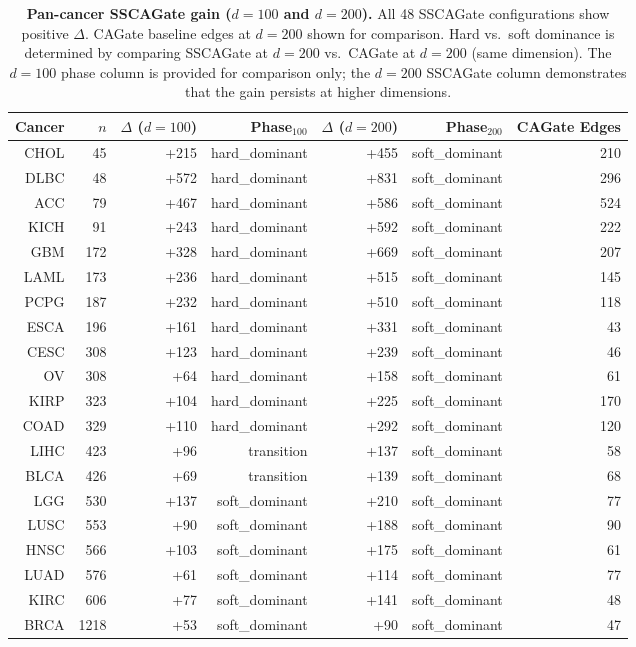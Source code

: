 \documentclass[12pt,a4paper]{article}
\begin{document}
\begin{table}[htbp]
\centering
\caption{\textbf{Pan-cancer SSCAGate gain ($d = 100$ and $d = 200$).}
All 48 SSCAGate configurations show positive $\Delta$. CAGate baseline edges
at $d = 200$ shown for comparison. Hard vs.\ soft dominance is determined by
comparing SSCAGate at $d = 200$ vs.\ CAGate at $d = 200$ (same dimension). The $d = 100$ phase column is provided for comparison only; the $d = 200$ SSCAGate
column demonstrates that the gain persists at higher dimensions.}
\label{tab:s1_pancan}
\small
\begin{tabular}{rrrrrrr}
\toprule
Cancer & $n$ & $\Delta$ ($d=100$) & Phase$_{100}$ & $\Delta$ ($d=200$) & Phase$_{200}$ & CAGate Edges \\
\midrule
CHOL & 45 & +215 & hard\_dominant & +455 & soft\_dominant & 210 \\
DLBC & 48 & +572 & hard\_dominant & +831 & soft\_dominant & 296 \\
ACC & 79 & +467 & hard\_dominant & +586 & soft\_dominant & 524 \\
KICH & 91 & +243 & hard\_dominant & +592 & soft\_dominant & 222 \\
GBM & 172 & +328 & hard\_dominant & +669 & soft\_dominant & 207 \\
LAML & 173 & +236 & hard\_dominant & +515 & soft\_dominant & 145 \\
PCPG & 187 & +232 & hard\_dominant & +510 & soft\_dominant & 118 \\
ESCA & 196 & +161 & hard\_dominant & +331 & soft\_dominant & 43 \\
CESC & 308 & +123 & hard\_dominant & +239 & soft\_dominant & 46 \\
OV & 308 & +64 & hard\_dominant & +158 & soft\_dominant & 61 \\
KIRP & 323 & +104 & hard\_dominant & +225 & soft\_dominant & 170 \\
COAD & 329 & +110 & hard\_dominant & +292 & soft\_dominant & 120 \\
LIHC & 423 & +96 & transition & +137 & soft\_dominant & 58 \\
BLCA & 426 & +69 & transition & +139 & soft\_dominant & 68 \\
LGG & 530 & +137 & soft\_dominant & +210 & soft\_dominant & 77 \\
LUSC & 553 & +90 & soft\_dominant & +188 & soft\_dominant & 90 \\
HNSC & 566 & +103 & soft\_dominant & +175 & soft\_dominant & 61 \\
LUAD & 576 & +61 & soft\_dominant & +114 & soft\_dominant & 77 \\
KIRC & 606 & +77 & soft\_dominant & +141 & soft\_dominant & 48 \\
BRCA & 1218 & +53 & soft\_dominant & +90 & soft\_dominant & 47 \\\bottomrule
\end{tabular}
\end{table}
\end{document}

